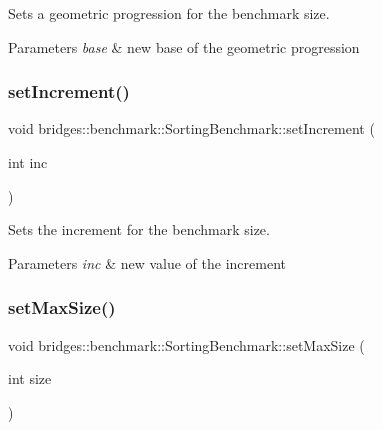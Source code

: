 Sets a geometric progression for the benchmark size. 


\begin{DoxyParams}{Parameters}
{\em base} & new base of the geometric progression \\
\hline
\end{DoxyParams}
\mbox{\label{classbridges_1_1benchmark_1_1_sorting_benchmark_ae168533dc5756f3ede3436bdd7840047}} 
\subsubsection{\texorpdfstring{setIncrement()}{setIncrement()}}
{\footnotesize\ttfamily void bridges\+::benchmark\+::\+Sorting\+Benchmark\+::set\+Increment (\begin{DoxyParamCaption}\item[{int}]{inc }\end{DoxyParamCaption})\hspace{0.3cm}{\ttfamily [inline]}}



Sets the increment for the benchmark size. 


\begin{DoxyParams}{Parameters}
{\em inc} & new value of the increment \\
\hline
\end{DoxyParams}
\mbox{\label{classbridges_1_1benchmark_1_1_sorting_benchmark_abdca289b823c7f240b648e248c07b059}} 
\subsubsection{\texorpdfstring{setMaxSize()}{setMaxSize()}}
{\footnotesize\ttfamily void bridges\+::benchmark\+::\+Sorting\+Benchmark\+::set\+Max\+Size (\begin{DoxyParamCaption}\item[{int}]{size }\end{DoxyParamCaption})\hspace{0.3cm}{\ttfamily [inline]}}



